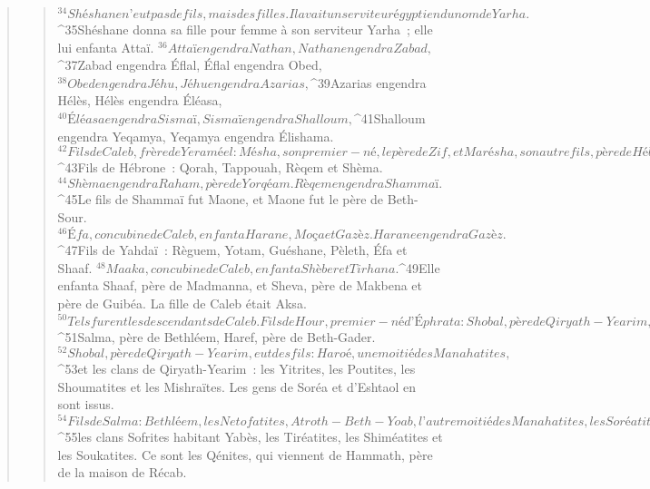 \begin{verse}
\begin{verse}
${}^{34}Shéshane n’eut pas de fils, mais des filles. Il avait un serviteur égyptien du nom de Yarha. 
${}^{35}Shéshane donna sa fille pour femme à son serviteur Yarha ; elle lui enfanta Attaï. 
${}^{36}Attaï engendra Nathan, Nathan engendra Zabad, 
${}^{37}Zabad engendra Éflal, Éflal engendra Obed, 
${}^{38}Obed engendra Jéhu, Jéhu engendra Azarias, 
${}^{39}Azarias engendra Hélès, Hélès engendra Éléasa, 
${}^{40}Éléasa engendra Sismaï, Sismaï engendra Shalloum, 
${}^{41}Shalloum engendra Yeqamya, Yeqamya engendra Élishama.
${}^{42}Fils de Caleb, frère de Yeraméel : Mésha, son premier-né, le père de Zif, et Marésha, son autre fils, père de Hébrone. 
${}^{43}Fils de Hébrone : Qorah, Tappouah, Rèqem et Shèma. 
${}^{44}Shèma engendra Raham, père de Yorqéam. Rèqem engendra Shammaï. 
${}^{45}Le fils de Shammaï fut Maone, et Maone fut le père de Beth-Sour. 
${}^{46}Éfa, concubine de Caleb, enfanta Harane, Moça et Gazèz. Harane engendra Gazèz. 
${}^{47}Fils de Yahdaï : Règuem, Yotam, Guéshane, Pèleth, Éfa et Shaaf. 
${}^{48}Maaka, concubine de Caleb, enfanta Shèber et Tirhana. 
${}^{49}Elle enfanta Shaaf, père de Madmanna, et Sheva, père de Makbena et père de Guibéa. La fille de Caleb était Aksa. 
${}^{50}Tels furent les descendants de Caleb.
      Fils de Hour, premier-né d’Éphrata : Shobal, père de Qiryath-Yearim, 
${}^{51}Salma, père de Bethléem, Haref, père de Beth-Gader. 
${}^{52}Shobal, père de Qiryath-Yearim, eut des fils : Haroé, une moitié des Manahatites, 
${}^{53}et les clans de Qiryath-Yearim : les Yitrites, les Poutites, les Shoumatites et les Mishraïtes. Les gens de Soréa et d’Eshtaol en sont issus.
${}^{54}Fils de Salma : Bethléem, les Netofatites, Atroth-Beth-Yoab, l’autre moitié des Manahatites, les Soréatites, 
${}^{55}les clans Sofrites habitant Yabès, les Tiréatites, les Shiméatites et les Soukatites. Ce sont les Qénites, qui viennent de Hammath, père de la maison de Récab.
      

\end{verse}
\end{verse}
